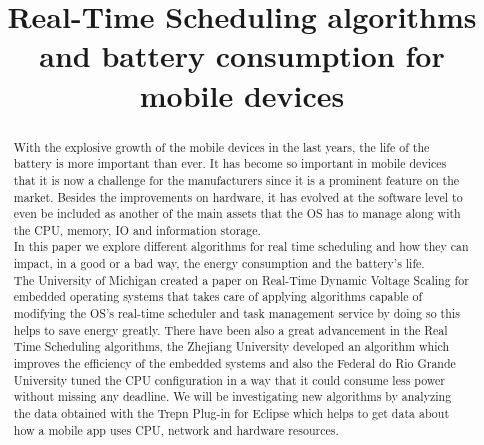 \documentclass[conference]{IEEEtran}
\begin{document}
 

\title{Real-Time Scheduling algorithms and battery consumption for mobile devices}



\author{
\and
{}
\and
{}
}


\maketitle


\begin{abstract}
With the explosive growth of the mobile devices in the last years, the life of the battery is more important than ever. It has become so important in mobile devices that it is now a challenge for the manufacturers since it is a prominent feature on the market. Besides the improvements on hardware, it has evolved at the software level to even be included as another of the main assets that the OS has to manage along with the CPU, memory, IO and information storage.\\
In this paper we explore different algorithms for real time scheduling and how they can impact, in a good or a bad way, the energy consumption and the battery’s life.\\
The University of Michigan created a paper on Real-Time Dynamic Voltage Scaling for embedded operating systems that takes care of applying algorithms capable of modifying the OS's real-time scheduler and task management service by doing so this helps to save energy greatly. There have been also a great advancement in the Real Time Scheduling algorithms, the Zhejiang University developed an algorithm which improves the efficiency of the embedded systems and also the Federal do Rio Grande University tuned the CPU configuration in a way that it could consume less power without missing any deadline. We will be investigating new algorithms by analyzing the data obtained with the Trepn Plug-in for Eclipse which helps to get data about how a mobile app uses CPU, network and hardware resources.
\end{abstract}
\end{document}
